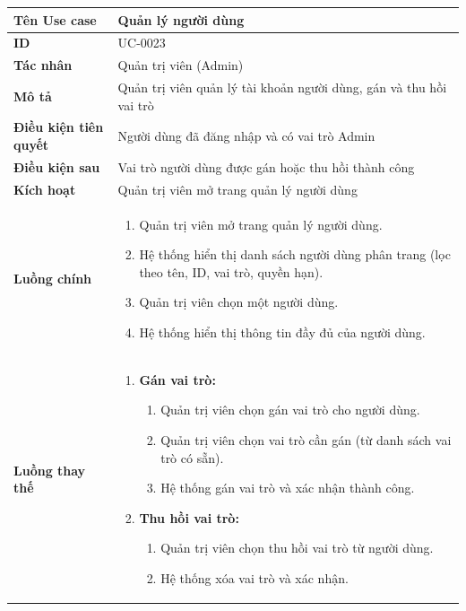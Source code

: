 {
\renewcommand{\arraystretch}{1.5}

\begin{tabularx}{\textwidth}{|>{\raggedright\arraybackslash}X|>{\raggedright\arraybackslash}X|}
\hline
\textbf{Tên Use case} & Quản lý người dùng \\
\hline
\textbf{ID} & UC-0023 \\
\hline
\textbf{Tác nhân} & Quản trị viên (Admin) \\
\hline
\textbf{Mô tả} & Quản trị viên quản lý tài khoản người dùng, gán và thu hồi vai trò \\
\hline
\textbf{Điều kiện tiên quyết} & Người dùng đã đăng nhập và có vai trò Admin \\
\hline
\textbf{Điều kiện sau} & Vai trò người dùng được gán hoặc thu hồi thành công \\
\hline
\textbf{Kích hoạt} & Quản trị viên mở trang quản lý người dùng \\
\hline
\textbf{Luồng chính} &
\begin{enumerate}
    \item Quản trị viên mở trang quản lý người dùng.
    \item Hệ thống hiển thị danh sách người dùng phân trang (lọc theo tên, ID, vai trò, quyền hạn).
    \item Quản trị viên chọn một người dùng.
    \item Hệ thống hiển thị thông tin đầy đủ của người dùng.
\end{enumerate} \\
\hline
\textbf{Luồng thay thế} &
\begin{enumerate}
    \item \textbf{Gán vai trò:}
    \begin{enumerate}
        \item[4A.] Quản trị viên chọn gán vai trò cho người dùng.
        \item[5A.] Quản trị viên chọn vai trò cần gán (từ danh sách vai trò có sẵn).
        \item[6A.] Hệ thống gán vai trò và xác nhận thành công.
    \end{enumerate}
    \item \textbf{Thu hồi vai trò:}
    \begin{enumerate}
        \item[4B.] Quản trị viên chọn thu hồi vai trò từ người dùng.
        \item[5B.] Hệ thống xóa vai trò và xác nhận.
    \end{enumerate}

\end{enumerate}
\end{tabularx}}
